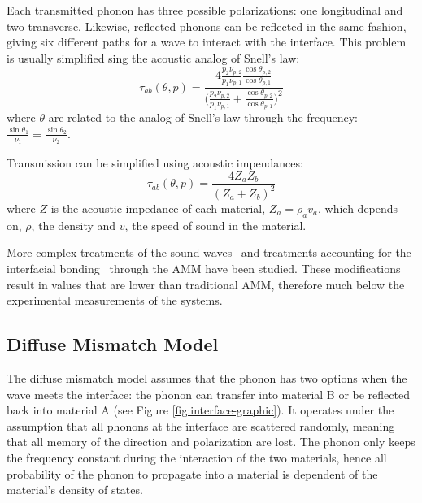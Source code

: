 Each transmitted phonon has three possible polarizations: one longitudinal and two transverse. Likewise, reflected phonons can be reflected in the same fashion, giving six different paths for a wave to interact with the interface. This problem is usually simplified sing the acoustic analog of Snell’s law:
\begin{equation}
\tau_{ab}(\theta, p) = \frac{4\frac{p_2 \nu_{p, 2}}{p_1 \nu_{p,1}} \frac{\cos{\theta_{p,2}}}{\cos{\theta_{p,1}}}}{\big( \frac{p_2 \nu_{p, 2}}{p_1 \nu_{p,1}}+ \frac{\cos{\theta_{p,2}}}{\cos{\theta_{p,1}}}\big)^2}
\end{equation}
where $\theta$ are related to the analog of Snell's law through the frequency: \(\frac{\sin{\theta_1}}{\nu_1} = \frac{\sin{\theta_2}}{\nu_2}\).

Transmission can be simplified using acoustic impendances:
\begin{equation}
\tau_{ab}(\theta, p) = \frac{4Z_a Z_b}{(Z_a +Z_b)^2}
\end{equation}
where $Z$ is the acoustic impedance of each material, $Z_a = \rho_a v_a$, which depends on, $\rho$, the density and $v$, the speed of sound in the material. 

More complex treatments of the sound waves~\cite{Prasher2000} and treatments accounting for the interfacial bonding~\cite{Prasher2009} through the AMM have been studied. These modifications result in values that are lower than traditional AMM, therefore much below the experimental measurements of the systems.~\cite{Cahill2006, Stoner1993}

\subsection{Diffuse Mismatch Model}
The diffuse mismatch model assumes that the phonon has two options when the wave meets the interface: the phonon can transfer into material B or be reflected back into material A (see Figure \ref{fig:interface-graphic}). It operates under the assumption that all phonons at the interface are scattered randomly, meaning that all memory of the direction and polarization are lost. The phonon only keeps the frequency constant during the interaction of the two materials, hence all probability of the phonon to propagate into a material is dependent of the material's density of states. 

